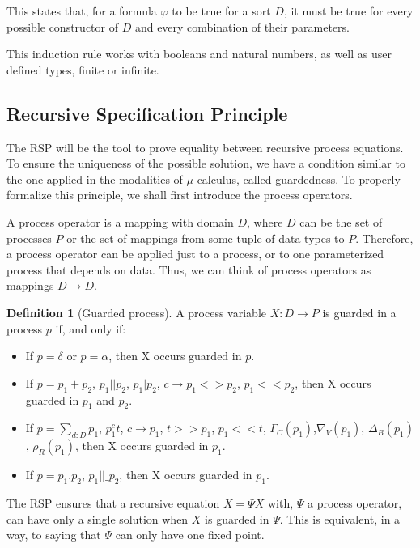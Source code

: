 \documentclass[11pt]{article}
\theoremstyle{definition}
\newtheorem{definition}{Definition}
\theoremstyle{plain}
\let\temp\phi
\let\phi\varphi
\let\varphi\temp
\begin{document}
This states that, for a formula $ \phi $ to be true for a sort $ D $, it must be true for every possible constructor of $ D $ and every combination of their parameters.

This induction rule works with booleans and natural numbers, as well as user defined types, finite or infinite.

\subsection{Recursive Specification Principle}
The RSP will be the tool to prove equality between recursive process equations. To ensure the uniqueness of the possible solution, we have a condition similar to the one applied in the modalities of $ \mu $-calculus, called guardedness. To properly formalize this principle, we shall first introduce the process operators.

A process operator is a mapping with domain $D$, where $D$ can be the set of processes $P$ or the set of mappings from some tuple of data types to $P$. Therefore, a process operator can be applied just to a process, or to one parameterized process that depends on data. Thus, we can think of process operators as mappings $D\longrightarrow D$.
\begin{definition}[Guarded process]
	A process variable $X:D\longrightarrow P$ is guarded in a process $p$ if, and only if:
	\begin{itemize}
		\item If $p = \delta $ or $p = \alpha $, then X occurs guarded in $p$.
		\item If $p = p_1 + p_2 $, $ p_1 || p_2 $, $ p_1 | p_2 $, $ c\rightarrow p_1 <> p_2 $, $ p_1 << p_2 $, then X occurs guarded in $ p_1 $ and $ p_2 $.
		\item If $p = \sum_{d:D} p_1 $, $ p_{1}^ct$, $ c \longrightarrow p_1 $, $ t >> p_1 $, $ p_1 << t $, $ \Gamma_{C}(p_1) $,$ \nabla_{V}(p_1) $, $ \Delta_{B}(p_1) $, $ \rho_{R}(p_1) $, then X occurs guarded in $ p_1 $.
		\item If $p =  p_1 . p_2 $, $ p_1 ||\_ p_2 $, then X occurs guarded in $ p_1 $.
	\end{itemize}
	
\end{definition}

The RSP ensures that a recursive equation $X =  \Psi X$ with, $ \Psi $ a process operator, can have only a single solution when $X$ is guarded in $ \Psi $. This is equivalent, in a way, to saying that $ \Psi $ can only have one fixed point.
\end{document}
